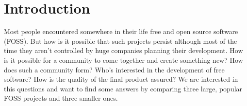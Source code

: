 \section{Introduction}
Most people encountered somewhere in their life free and open source software (FOSS). But how is it possible that such projects persist although most of the time they aren't controlled by huge companies planning their development. How is it possible for a community to come together and create something new? How does such a community form? Who's interested in the development of free software? How is the quality of the final product assured? We are interested in this questions and want to find some answers by comparing three large, popular FOSS projects and three smaller ones.



